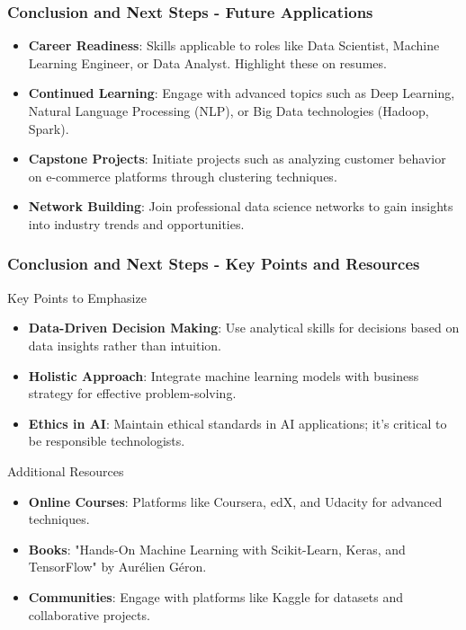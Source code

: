 \documentclass[aspectratio=169]{beamer}
\begin{document}
\begin{frame}[fragile]
  \frametitle{Conclusion and Next Steps - Future Applications}
  \begin{itemize}
    \item \textbf{Career Readiness}: Skills applicable to roles like Data Scientist, Machine Learning Engineer, or Data Analyst. Highlight these on resumes.
    
    \item \textbf{Continued Learning}: Engage with advanced topics such as Deep Learning, Natural Language Processing (NLP), or Big Data technologies (Hadoop, Spark).
    
    \item \textbf{Capstone Projects}: Initiate projects such as analyzing customer behavior on e-commerce platforms through clustering techniques.
    
    \item \textbf{Network Building}: Join professional data science networks to gain insights into industry trends and opportunities.
  \end{itemize}
\end{frame}

\begin{frame}[fragile]
  \frametitle{Conclusion and Next Steps - Key Points and Resources}
  \begin{block}{Key Points to Emphasize}
    \begin{itemize}
      \item \textbf{Data-Driven Decision Making}: Use analytical skills for decisions based on data insights rather than intuition.
      \item \textbf{Holistic Approach}: Integrate machine learning models with business strategy for effective problem-solving.
      \item \textbf{Ethics in AI}: Maintain ethical standards in AI applications; it's critical to be responsible technologists.
    \end{itemize}
  \end{block}
  
  \begin{block}{Additional Resources}
    \begin{itemize}
      \item \textbf{Online Courses}: Platforms like Coursera, edX, and Udacity for advanced techniques.
      \item \textbf{Books}: "Hands-On Machine Learning with Scikit-Learn, Keras, and TensorFlow" by Aurélien Géron.
      \item \textbf{Communities}: Engage with platforms like Kaggle for datasets and collaborative projects.
    \end{itemize}
  \end{block}
\end{frame}
\end{document}
